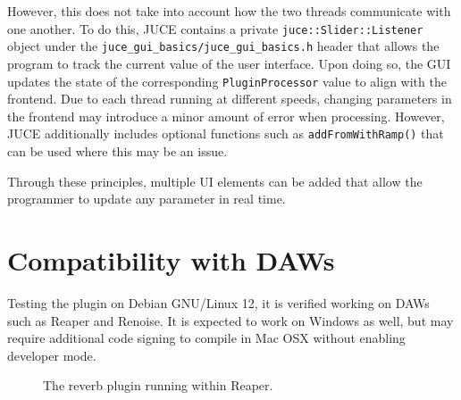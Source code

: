 \begin{singlespace}

\end{singlespace} \hfill \break
\hspace*{0.6cm}However, this does not take into account how the two threads communicate with one another. To do this, JUCE contains a private \verb|juce::Slider::Listener| object under the \verb|juce_gui_basics/juce_gui_basics.h| header that allows the program to track the current value of the user interface. Upon doing so, the GUI updates the state of the corresponding \verb|PluginProcessor| value to align with the frontend. Due to each thread running at different speeds, changing parameters in the frontend may introduce a minor amount of error when processing. However, JUCE additionally includes optional functions such as \verb|addFromWithRamp()| that can be used where this may be an issue.

\hfill \break

\begin{singlespace}

\end{singlespace} \hfill \break
\hspace*{0.6cm} Through these principles, multiple UI elements can be added that allow the programmer to update any parameter in real time.

\section{Compatibility with DAWs}
Testing the plugin on Debian GNU/Linux 12, it is verified working on DAWs such as Reaper and Renoise. It is expected to work on Windows as well, but may require additional code signing to compile in Mac OSX without enabling developer mode.

\begin{figure}[h] %
	\begin{center}
		\caption{The reverb plugin running within Reaper.}
	\end{center}
\end{figure}

